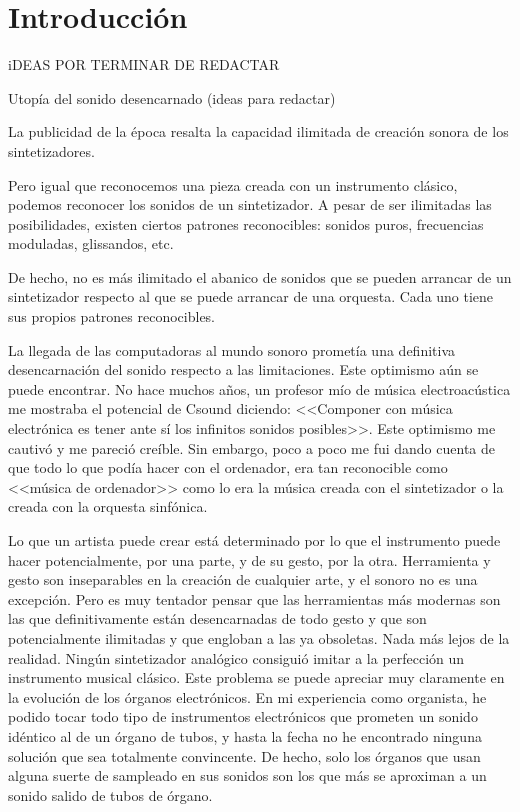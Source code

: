 \chapter[Introducción]{Introducción}

iDEAS POR TERMINAR DE REDACTAR

Utopía del sonido desencarnado (ideas para redactar)

La publicidad de la época resalta la capacidad ilimitada de creación sonora de los sintetizadores.

Pero igual que reconocemos una pieza creada con un instrumento clásico, podemos reconocer los sonidos de un sintetizador. A pesar de ser ilimitadas las posibilidades, existen ciertos patrones reconocibles: sonidos puros, frecuencias moduladas, glissandos, etc. 

De hecho, no es más ilimitado el abanico de sonidos que se pueden arrancar de un sintetizador respecto al que se puede arrancar de una orquesta. Cada uno tiene sus propios patrones reconocibles. 

La llegada de las computadoras al mundo sonoro prometía una definitiva desencarnación del sonido respecto a las limitaciones. Este optimismo aún se puede encontrar. No hace muchos años, un profesor mío de música electroacústica me mostraba el potencial de Csound diciendo: <<Componer con música electrónica es tener ante sí los infinitos sonidos posibles>>. Este optimismo me cautivó y me pareció creíble. Sin embargo, poco a poco me fui dando cuenta de que todo lo que podía hacer con el ordenador, era tan reconocible como <<música de ordenador>> como lo era la música creada con el sintetizador o la creada con la orquesta sinfónica. 

Lo que un artista puede crear está determinado por lo que el instrumento puede hacer potencialmente, por una parte, y de su gesto, por la otra. Herramienta y gesto son inseparables en la creación de cualquier arte, y el sonoro no es una excepción. Pero es muy tentador pensar que las herramientas más modernas son las que definitivamente están desencarnadas de todo gesto y que son potencialmente ilimitadas y que engloban a las ya obsoletas. Nada más lejos de la realidad. Ningún sintetizador analógico consiguió imitar a la perfección un instrumento musical clásico. Este problema se puede apreciar muy claramente en la evolución de los órganos electrónicos. En mi experiencia como organista, he podido tocar todo tipo de instrumentos electrónicos que prometen un sonido idéntico al de un órgano de tubos, y hasta la fecha no he encontrado ninguna solución que sea totalmente convincente. De hecho, solo los órganos que usan alguna suerte de sampleado en sus sonidos son los que más se aproximan a un sonido salido de tubos de órgano.

